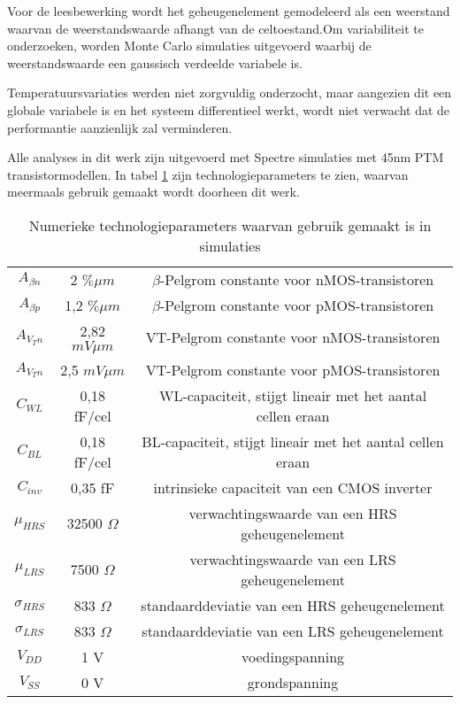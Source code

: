 Voor de leesbewerking wordt het geheugenelement gemodeleerd als een weerstand waarvan de weerstandswaarde afhangt van de celtoestand.Om variabiliteit te onderzoeken, worden Monte Carlo simulaties uitgevoerd waarbij de weerstandswaarde een gaussisch verdeelde variabele is.

Temperatuursvariaties werden niet zorgvuldig onderzocht, maar aangezien dit een globale variabele is en het systeem differentieel werkt, wordt niet verwacht dat de performantie aanzienlijk zal verminderen.

Alle analyses in dit werk zijn uitgevoerd met Spectre simulaties met 45nm PTM transistormodellen. In tabel \ref{tab:properties} zijn technologieparameters te zien, waarvan meermaals gebruik gemaakt wordt doorheen dit werk.

\begin{table}
	\begin{tabular}{ccc}
	\hline
    $A_{\beta n}$ & 2 $\% \mu m$ & $\beta$-Pelgrom constante voor nMOS-transistoren \\
    $A_{\beta p}$ & 1,2 $\% \mu m$ & $\beta$-Pelgrom constante voor pMOS-transistoren \\
    $A_{V_{T} n}$ & 2,82 $mV \mu m$ & VT-Pelgrom constante voor nMOS-transistoren \\
    $A_{V_{T} n}$ & 2,5 $mV \mu m$ & VT-Pelgrom constante voor pMOS-transistoren \\
    $C_{WL}$ & 0,18 fF/cel & WL-capaciteit, stijgt lineair met het aantal cellen eraan \\
    $C_{BL}$ & 0,18 fF/cel & BL-capaciteit, stijgt lineair met het aantal cellen eraan \\
    $C_{inv}$ & 0,35 fF & intrinsieke capaciteit van een CMOS inverter \\
    $\mu_{HRS}$ & 32500 $\Omega$ & verwachtingswaarde van een HRS geheugenelement \\
    $\mu_{LRS}$ & 7500 $\Omega$ & verwachtingswaarde van een LRS geheugenelement \\
    $\sigma_{HRS}$ & 833 $\Omega$ & standaarddeviatie van een HRS geheugenelement \\
    $\sigma_{LRS}$ & 833 $\Omega$ & standaarddeviatie van een LRS geheugenelement \\
    $V_{DD}$ & 1 V & voedingspanning \\
    $V_{SS}$ & 0 V & grondspanning \\
    \hline
  \end{tabular}
  \caption[Technologieparameters]{Numerieke technologieparameters waarvan gebruik gemaakt is in simulaties}
  \label{tab:properties}
\end{table}


